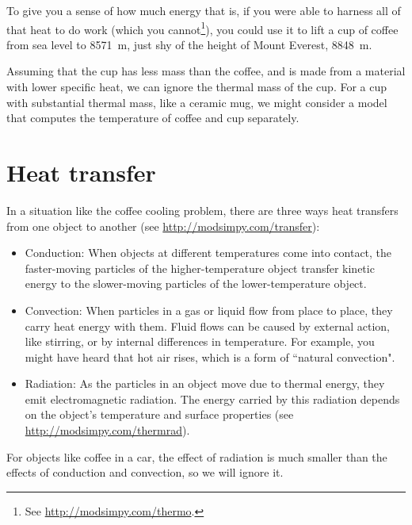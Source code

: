 \documentclass[12pt]{book}
\theoremstyle{exercise}
\begin{document}
To give you a sense of how much energy that is, if you were able to harness all of that heat to do work (which you cannot\footnote{See \url{http://modsimpy.com/thermo}.}), you could use it to lift a cup of coffee from sea level to \SI{8571}{\meter}, just shy of the height of Mount Everest, \SI{8848}{\meter}.


Assuming that the cup has less mass than the coffee, and is made from a material with lower specific heat, we can ignore the thermal mass of the cup.
For a cup with substantial thermal mass, like a ceramic mug, we might consider a model that computes the temperature of coffee and cup separately.


\section{Heat transfer}

In a situation like the coffee cooling problem, there are three ways heat transfers from one object to another (see \url{http://modsimpy.com/transfer}):


\begin{itemize}

\item Conduction: When objects at different temperatures come into contact, the faster-moving particles of the higher-temperature object transfer kinetic energy to the slower-moving particles of the lower-temperature object.

\item Convection: When particles in a gas or liquid flow from place to place, they carry heat energy with them.  Fluid flows can be caused by external action, like stirring, or by internal differences in temperature.  For example, you might have heard that hot air rises, which is a form of ``natural convection".


\item Radiation: As the particles in an object move due to thermal energy, they emit electromagnetic radiation.  The energy carried by this radiation depends on the object's temperature and surface properties (see \url{http://modsimpy.com/thermrad}).

\end{itemize}

For objects like coffee in a car, the effect of radiation is much smaller than the effects of conduction and convection, so we will ignore it.
\end{document}
